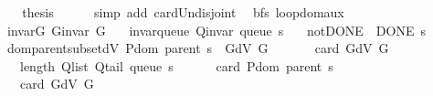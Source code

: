 \begin{isabellebody}
\ \ \isamarkupfalse%
\ \isamarkupfalse%
\ {\isacharquery}{\kern0pt}thesis\isanewline
\ \ \ \ \isamarkupfalse%
\ {\isacharparenleft}{\kern0pt}simp\ add{\isacharcolon}{\kern0pt}\ card{\isacharunderscore}{\kern0pt}Un{\isacharunderscore}{\kern0pt}disjoint{\isacharparenright}{\kern0pt}\isanewline
{}\isamarkupfalse%
%
\endisatagproof
{\isafoldproof}%
%
\isadelimproof
\isanewline
%
\endisadelimproof
%
\isadeliminvisible
\isanewline
%
\endisadeliminvisible
%
\isataginvisible
{}\isamarkupfalse%
\ {\isacharparenleft}{\kern0pt}\ bfs{\isacharparenright}{\kern0pt}\ loop{\isacharunderscore}{\kern0pt}dom{\isacharunderscore}{\kern0pt}aux{\isacharunderscore}{\kern0pt}{}{\isacharcolon}{\kern0pt}\isanewline
\ \ \ invar{\isacharunderscore}{\kern0pt}G{\isacharcolon}{\kern0pt}\ {\isachardoublequoteopen}G{\isachardot}{\kern0pt}invar\ G{\isachardoublequoteclose}\isanewline
\ \ \ invar{\isacharunderscore}{\kern0pt}queue{\isacharcolon}{\kern0pt}\ {\isachardoublequoteopen}Q{\isacharunderscore}{\kern0pt}invar\ {\isacharparenleft}{\kern0pt}queue\ s{\isacharparenright}{\kern0pt}{\isachardoublequoteclose}\isanewline
\ \ \ not{\isacharunderscore}{\kern0pt}DONE{\isacharcolon}{\kern0pt}\ {\isachardoublequoteopen}{\isasymnot}\ DONE\ s{\isachardoublequoteclose}\isanewline
\ \ \ dom{\isacharunderscore}{\kern0pt}parent{\isacharunderscore}{\kern0pt}subset{\isacharunderscore}{\kern0pt}dV{\isacharcolon}{\kern0pt}\ {\isachardoublequoteopen}P{\isachardot}{\kern0pt}dom\ {\isacharparenleft}{\kern0pt}parent\ s{\isacharparenright}{\kern0pt}\ {\isasymsubseteq}\ G{\isachardot}{\kern0pt}dV\ G{\isachardoublequoteclose}\isanewline
\ \ \isanewline
\ \ \ \ {\isachardoublequoteopen}card\ {\isacharparenleft}{\kern0pt}G{\isachardot}{\kern0pt}dV\ G{\isacharparenright}{\kern0pt}\ {\isacharplus}{\kern0pt}\isanewline
\ \ \ \ \ length\ {\isacharparenleft}{\kern0pt}Q{\isacharunderscore}{\kern0pt}list\ {\isacharparenleft}{\kern0pt}Q{\isacharunderscore}{\kern0pt}tail\ {\isacharparenleft}{\kern0pt}queue\ s{\isacharparenright}{\kern0pt}{\isacharparenright}{\kern0pt}{\isacharparenright}{\kern0pt}\ {\isacharminus}{\kern0pt}\isanewline
\ \ \ \ \ card\ {\isacharparenleft}{\kern0pt}P{\isachardot}{\kern0pt}dom\ {\isacharparenleft}{\kern0pt}parent\ s{\isacharparenright}{\kern0pt}{\isacharparenright}{\kern0pt}\ {\isacharless}{\kern0pt}\isanewline
\ \ \ \ \ card\ {\isacharparenleft}{\kern0pt}G{\isachardot}{\kern0pt}dV\ G{\isacharparenright}{\kern0pt}\ {\isacharplus}{\kern0pt}\isanewline

\end{isabellebody}
